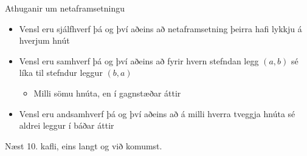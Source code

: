 \documentclass{beamer}
\begin{document}
\begin{frame}{Athuganir um netaframsetningu}
\begin{itemize}
 \item Vensl eru sjálfhverf þá og því aðeins að netaframsetning þeirra hafi lykkju á hverjum hnút
 \item Vensl eru samhverf þá og því aðeins að fyrir hvern stefndan legg $(a,b)$ sé líka til stefndur leggur $(b, a)$
 \begin{itemize}
  \item Milli sömu hnúta, en í gagnstæðar áttir
 \end{itemize}
 \item Vensl eru andsamhverf þá og því aðeins að á milli hverra tveggja hnúta sé aldrei leggur í báðar áttir
\end{itemize}

\end{frame}



\begin{frame}{Næst}
10. kafli, eins langt og við komumst.
\end{frame}
\end{document}
